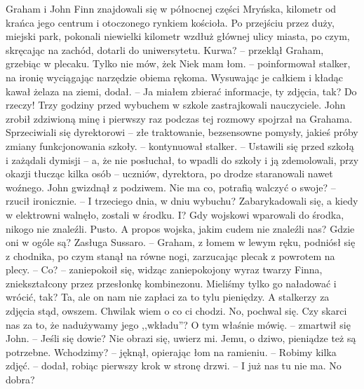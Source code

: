 \documentclass[../MAIN.tex]{subfiles}
\begin{document}
Graham i John Finn znajdowali się w północnej części Mryńska, kilometr od krańca jego centrum i otoczonego rynkiem kościoła. Po przejściu przez duży, miejski park, pokonali niewielki kilometr wzdłuż głównej ulicy miasta, po czym, skręcając na zachód, dotarli do uniwersytetu.
\sx Kurwa? -- przeklął Graham, grzebiąc w plecaku.
\xx Tylko nie mów, że\3k
\xx Nie\3k mam łom. -- poinformował stalker, na ironię wyciągając narzędzie obiema rękoma. Wysuwając je całkiem i kładąc kawał żelaza na ziemi, dodał. -- Ja miałem zbierać informacje, ty zdjęcia, tak?
\xx Do rzeczy!
\xx Trzy godziny przed wybuchem w szkole zastrajkowali nauczyciele.
\qd
John zrobił zdziwioną minę i pierwszy raz podczas tej rozmowy spojrzał na Grahama.
\sx Sprzeciwiali się dyrektorowi -- złe traktowanie, bezsensowne pomysły, jakieś próby zmiany funkcjonowania szkoły. -- kontynuował stalker. -- Ustawili się przed szkołą i zażądali dymisji -- a, że nie posłuchał, to wpadli do szkoły i ją zdemolowali, przy okazji tłucząc kilka osób -- uczniów, dyrektora, po drodze staranowali nawet woźnego.
\qd
John gwizdnął z podziwem.
\sx Nie ma co, potrafią walczyć o swoje? -- rzucił ironicznie. -- I trzeciego dnia, w dniu wybuchu?
\xx Zabarykadowali się, a kiedy w elektrowni walnęło, zostali w środku.
\xx I?
\xx Gdy wojskowi wparowali do środka, nikogo nie znaleźli. Pusto.
\xx A propos wojska, jakim cudem nie znaleźli nas? Gdzie oni w ogóle są?
\xx Zasługa Sussaro. -- Graham, z łomem w lewym ręku, podniósł się z chodnika, po czym stanął na równe nogi, zarzucając plecak z powrotem na plecy. -- Co? -- zaniepokoił się, widząc zaniepokojony wyraz twarzy Finna, zniekształcony przez przesłonkę kombinezonu.
\xx Mieliśmy tylko go naładować i wrócić, tak?
\xx Ta, ale on nam nie zapłaci za to tylu pieniędzy. A stalkerzy za zdjęcia stąd, owszem. Chwila\3k wiem o co ci chodzi.
\xx No, pochwal się.
\xx Czy skarci nas za to, że nadużywamy jego ,,wkładu''?
\xx O tym właśnie mówię. -- zmartwił się John. -- Jeśli się dowie?
\xx Nie obrazi się, uwierz mi. Jemu, o dziwo, pieniądze też są potrzebne. Wchodzimy? -- jęknął, opierając łom na ramieniu. -- Robimy kilka zdjęć. -- dodał, robiąc pierwszy krok w stronę drzwi. -- I już nas tu nie ma.
\xx No dobra?
\qd
\end{document}
